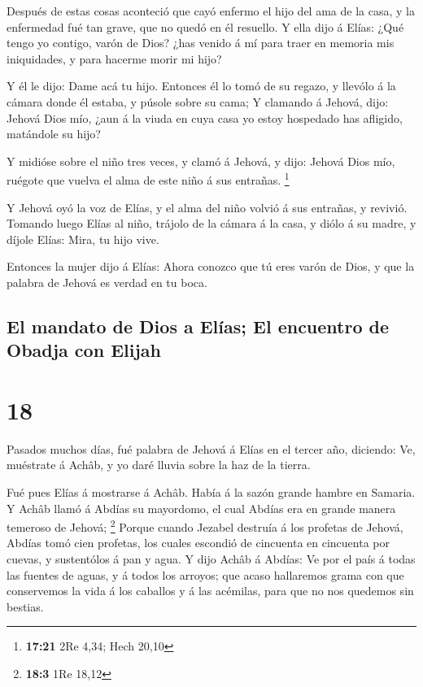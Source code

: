  Después de estas cosas aconteció que cayó enfermo el
hijo del ama de la casa, y la enfermedad fué tan grave, que no quedó en
él resuello.  Y ella dijo á Elías: ¿Qué tengo yo contigo,
varón de Dios? ¿has venido á mí para traer en memoria mis iniquidades, y
para hacerme morir mi hijo?

 Y él le dijo: Dame acá tu hijo. Entonces él lo tomó de
su regazo, y llevólo á la cámara donde él estaba, y púsole sobre su
cama;  Y clamando á Jehová, dijo: Jehová Dios mío, ¿aun á
la viuda en cuya casa yo estoy hospedado has afligido, matándole su
hijo?

 Y midióse sobre el niño tres veces, y clamó á Jehová, y
dijo: Jehová Dios mío, ruégote que vuelva el alma de este niño á sus
entrañas. \footnote{\textbf{17:21} 2Re 4,34; Hech 20,10}

 Y Jehová oyó la voz de Elías, y el alma del niño volvió
á sus entrañas, y revivió.  Tomando luego Elías al niño,
trájolo de la cámara á la casa, y diólo á su madre, y díjole Elías:
Mira, tu hijo vive.

 Entonces la mujer dijo á Elías: Ahora conozco que tú
eres varón de Dios, y que la palabra de Jehová es verdad en tu boca.

\hypertarget{el-mandato-de-dios-a-eluxedas-el-encuentro-de-obadja-con-elijah}{%
\subsection{El mandato de Dios a Elías; El encuentro de Obadja con
Elijah}\label{el-mandato-de-dios-a-eluxedas-el-encuentro-de-obadja-con-elijah}}

\hypertarget{section-17}{%
\section{18}\label{section-17}}

 Pasados muchos días, fué palabra de Jehová á Elías en el
tercer año, diciendo: Ve, muéstrate á Achâb, y yo daré lluvia sobre la
haz de la tierra.

 Fué pues Elías á mostrarse á Achâb. Había á la sazón
grande hambre en Samaria.  Y Achâb llamó á Abdías su
mayordomo, el cual Abdías era en grande manera temeroso de Jehová;
\footnote{\textbf{18:3} 1Re 18,12}  Porque cuando Jezabel
destruía á los profetas de Jehová, Abdías tomó cien profetas, los cuales
escondió de cincuenta en cincuenta por cuevas, y sustentólos á pan y
agua.  Y dijo Achâb á Abdías: Ve por el país á todas las
fuentes de aguas, y á todos los arroyos; que acaso hallaremos grama con
que conservemos la vida á los caballos y á las acémilas, para que no nos
quedemos sin bestias.

